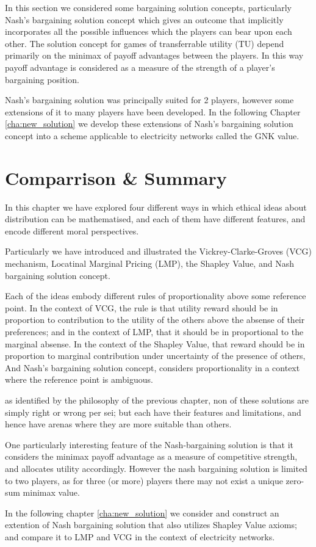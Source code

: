 In this section we considered some bargaining solution concepts, particularly Nash's bargaining solution concept which gives an outcome that implicitly incorporates all the possible influences which the players can bear upon each other.
The solution concept for games of transferrable utility (TU) depend primarily on the minimax of payoff advantages between the players.
In this way payoff advantage is considered as a measure of the strength of a player's bargaining position.

Nash's bargaining solution was principally suited for 2 players, however some extensions of it to many players have been developed.%
In the following Chapter \ref{cha:new_solution} we develop these extensions of Nash's bargaining solution concept into a scheme applicable to electricity networks called the GNK value.





\section{Comparrison \& Summary}

In this chapter we have explored four different ways in which ethical ideas about distribution can be mathematised, and each of them have different features, and encode different moral perspectives.

Particularly we have introduced and illustrated the Vickrey-Clarke-Groves (VCG) mechanism, Locatinal Marginal Pricing (LMP), the Shapley Value, and Nash bargaining solution concept.

Each of the ideas embody different rules of proportionality above some reference point.
In the context of VCG, the rule is that utility reward should be in proportion to contribution to the utility of the others above the absense of their preferences; and in the context of LMP, that it should be in proportional to the marginal absense.
In the context of the Shapley Value, that reward should be in proportion to marginal contribution under uncertainty of the presence of others,
And Nash's bargaining solution concept, considers proportionality in a context where the reference point is ambiguous.

as identified by the philosophy of the previous chapter, non of these solutions are simply right or wrong per sei; but each have their features and limitations, and hence have arenas where they are more suitable than others.

One particularly interesting feature of the Nash-bargaining solution is that it considers the minimax payoff advantage as a measure of competitive strength, and allocates utility accordingly.
However the nash bargaining solution is limited to two players, as for three (or more) players there may not exist a unique zero-sum minimax value.

In the following chapter \ref{cha:new_solution} we consider and construct an extention of Nash bargaining solution that also utilizes Shapley Value axioms; and compare it to LMP and VCG in the context of electricity networks.




